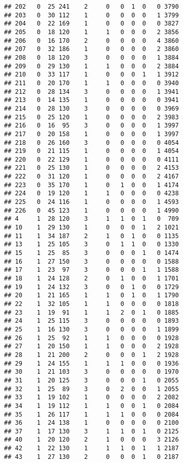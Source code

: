 \documentclass[]{book}
\begin{document}
\begin{verbatim}
## 202   0  25 241    2     0   0  1  0   0 3790
## 203   0  30 112    1     0   0  0  0   1 3799
## 204   0  22 169    1     0   0  0  0   0 3827
## 205   0  18 120    1     1   0  0  0   2 3856
## 206   0  16 170    2     0   0  0  0   4 3860
## 207   0  32 186    1     0   0  0  0   2 3860
## 208   0  18 120    3     0   0  0  0   1 3884
## 209   0  29 130    1     1   0  0  0   2 3884
## 210   0  33 117    1     0   0  0  1   1 3912
## 211   0  20 170    1     1   0  0  0   0 3940
## 212   0  28 134    3     0   0  0  0   1 3941
## 213   0  14 135    1     0   0  0  0   0 3941
## 214   0  28 130    3     0   0  0  0   0 3969
## 215   0  25 120    1     0   0  0  0   2 3983
## 216   0  16  95    3     0   0  0  0   1 3997
## 217   0  20 158    1     0   0  0  0   1 3997
## 218   0  26 160    3     0   0  0  0   0 4054
## 219   0  21 115    1     0   0  0  0   1 4054
## 220   0  22 129    1     0   0  0  0   0 4111
## 221   0  25 130    1     0   0  0  0   2 4153
## 222   0  31 120    1     0   0  0  0   2 4167
## 223   0  35 170    1     0   1  0  0   1 4174
## 224   0  19 120    1     1   0  0  0   0 4238
## 225   0  24 116    1     0   0  0  0   1 4593
## 226   0  45 123    1     0   0  0  0   1 4990
## 4     1  28 120    3     1   1  0  1   0  709
## 10    1  29 130    1     0   0  0  1   2 1021
## 11    1  34 187    2     1   0  1  0   0 1135
## 13    1  25 105    3     0   1  1  0   0 1330
## 15    1  25  85    3     0   0  0  1   0 1474
## 16    1  27 150    3     0   0  0  0   0 1588
## 17    1  23  97    3     0   0  0  1   1 1588
## 18    1  24 128    2     0   1  0  0   1 1701
## 19    1  24 132    3     0   0  1  0   0 1729
## 20    1  21 165    1     1   0  1  0   1 1790
## 22    1  32 105    1     1   0  0  0   0 1818
## 23    1  19  91    1     1   2  0  1   0 1885
## 24    1  25 115    3     0   0  0  0   0 1893
## 25    1  16 130    3     0   0  0  0   1 1899
## 26    1  25  92    1     1   0  0  0   0 1928
## 27    1  20 150    1     1   0  0  0   2 1928
## 28    1  21 200    2     0   0  0  1   2 1928
## 29    1  24 155    1     1   1  0  0   0 1936
## 30    1  21 103    3     0   0  0  0   0 1970
## 31    1  20 125    3     0   0  0  1   0 2055
## 32    1  25  89    3     0   2  0  0   1 2055
## 33    1  19 102    1     0   0  0  0   2 2082
## 34    1  19 112    1     1   0  0  1   0 2084
## 35    1  26 117    1     1   1  0  0   0 2084
## 36    1  24 138    1     0   0  0  0   0 2100
## 37    1  17 130    3     1   1  0  1   0 2125
## 40    1  20 120    2     1   0  0  0   3 2126
## 42    1  22 130    1     1   1  0  1   1 2187
## 43    1  27 130    2     0   0  0  1   0 2187

\end{verbatim}
\end{document}
